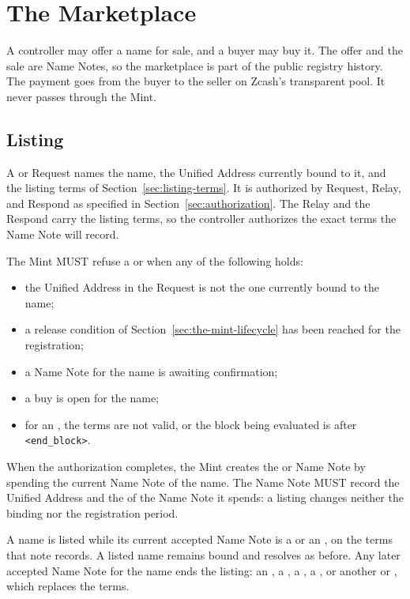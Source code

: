 \section{The Marketplace}
\label{sec:marketplace}

A controller may offer a name for sale, and a buyer may buy it. The offer and the sale are Name Notes, so the marketplace is part of the public registry history. The payment goes from the buyer to the seller on Zcash's transparent pool. It never passes through the Mint.

\subsection{Listing}

A  or  Request names the name, the Unified Address currently bound to it, and the listing terms of Section~\ref{sec:listing-terms}. It is authorized by Request, Relay, and Respond as specified in Section~\ref{sec:authorization}. The Relay and the Respond carry the listing terms, so the controller authorizes the exact terms the Name Note will record.

The Mint MUST refuse a  or  when any of the following holds:

\begin{itemize}
  \item the Unified Address in the Request is not the one currently bound to the name;
  \item a release condition of Section~\ref{sec:the-mint-lifecycle} has been reached for the registration;
  \item a Name Note for the name is awaiting confirmation;
  \item a buy is open for the name;
  \item for an , the terms are not valid, or the block being evaluated is after \texttt{<end\_block>}.
\end{itemize}

When the authorization completes, the Mint creates the  or  Name Note by spending the current Name Note of the name. The Name Note MUST record the Unified Address and the  of the Name Note it spends: a listing changes neither the binding nor the registration period.

A name is listed while its current accepted Name Note is a  or an , on the terms that note records. A listed name remains bound and resolves as before. Any later accepted Name Note for the name ends the listing: an , a , a , a , or another  or , which replaces the terms.

